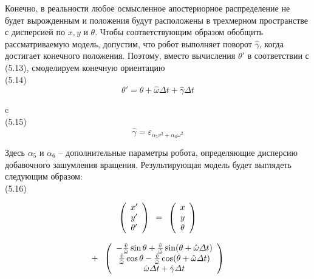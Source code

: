\documentclass[10pt,a4paper]{article}
\begin{document}
Конечно, в реальности любое осмысленное апостериорное распределение не будет вырожденным и положения будут расположены в трехмерном пространстве с дисперсией по $x, y$ и $\theta$. Чтобы соответствующим образом обобщить рассматриваемую модель, допустим, что робот выполняет поворот $\hat{\gamma}$, когда достигает конечного положения. Поэтому, вместо вычисления $\theta'$ в соответствии с (5.13), смоделируем конечную ориентацию \\

(5.14)
$$\theta'=\theta+\hat{\omega}\varDelta t+\hat{\gamma}\varDelta t$$

c\\

(5.15)
$$\hat{\gamma}=\varepsilon_{\alpha_5v^2+\alpha_6\omega^2}$$

Здесь $\alpha_5$ и $\alpha_6$ – дополнительные параметры робота, определяющие дисперсию добавочного зашумления вращения. Результирующая модель будет выглядеть следующим образом:\\

(5.16) 
\begin{minipage}{0.3\textwidth}
	\begin{equation*}
	\left(\begin{array}{c}
	x'\\
	y'\\
	\theta'\\
	\end{array}\right)
	\hspace{2mm}
	\mbox {=} \hspace{2mm}\left(\begin{array}{c}
	x\\
	y\\
	\theta\\
	\end{array}\right)
	\end{equation*}
\end{minipage}
\begin{minipage}{0.3\textwidth}
	\begin{equation*}
	\mbox {+} \hspace{2mm} 
	\left(\begin{array}{c}
	-\frac{\hat{v}}{\hat{\omega}}\sin\theta+\frac{\hat{v}}{\hat{\omega}}\sin(\theta+\hat{\omega}\varDelta t)\\
	\frac{\hat{v}}{\hat{\omega}}\cos\theta-\frac{\hat{v}}{\hat{\omega}}\cos(\theta+\hat{\omega}\varDelta t)\\
	\hat{\omega}\varDelta t+\hat{\gamma}\varDelta t\\
	\end{array}\right)
	\end{equation*}
\end{minipage}\\
\end{document}
